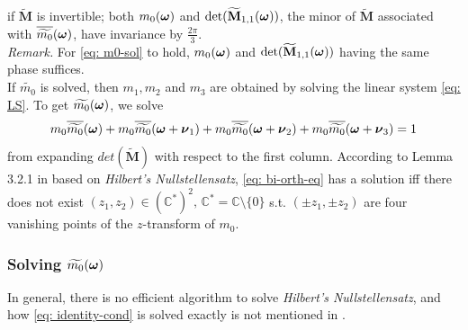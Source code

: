 if $\widetilde{\mathbf{M}}$ is invertible; both $m_{0}(\boldsymbol{\omega})$ and $\det(\widetilde{\mathbf{M}}_{1,1}(\boldsymbol{\omega}))$, the minor of $\widetilde{\mathbf{M}}$ associated with $\overline{\widetilde{m_{0}}}(\boldsymbol{\omega})$, have invariance by $\frac{2\pi}{3}$.\\
{\it Remark.} For \eqref{eq: m0-sol} to hold, $m_{0}(\boldsymbol{\omega})$ and $\det(\widetilde{\mathbf{M}}_{1,1}(\boldsymbol{\omega}))$ having the same phase suffices. \\
If $\widetilde{m_0}$ is solved, then $m_1,m_2$ and $m_3$ are obtained by solving the linear system \eqref{eq: LS}.
To get $\widetilde{m_{0}}(\boldsymbol{\omega})$, we solve 
\begin{align}\label{eq: bi-orth-eq}
m_0\overline{\widetilde{m_{0}}}(\boldsymbol{\omega}) + m_0\overline{\widetilde{m_{0}}}(\boldsymbol{\omega} + \boldsymbol{\nu}_{1}) + m_0\overline{\widetilde{m_{0}}}(\boldsymbol{\omega} + \boldsymbol{\nu}_{2}) + m_0\overline{\widetilde{m_{0}}}(\boldsymbol{\omega} + \boldsymbol{\nu}_{3}) = 1
\end{align}
from expanding $det(\widetilde{\mathbf{M}})$ with respect to the first column.
According to Lemma 3.2.1 in \cite{cohen1993compactly} based on {\it Hilbert's Nullstellensatz}, \eqref{eq: bi-orth-eq} has a solution iff there does not exist $(z_1,z_2)\in (\mathbb{C}^*)^2,\, \mathbb{C}^* = \mathbb{C}\setminus\{0\}$ s.t. $(\pm z_1,\pm z_2)$ are four 
vanishing points of the $z$-transform of $m_0$.

\subsubsection{Solving $\widetilde{m_{0}}(\boldsymbol{\omega})$}
In general, there is no efficient algorithm to solve {\it Hilbert's Nullstellensatz}, and how \eqref{eq: identity-cond} is solved exactly is not mentioned in \cite{cohen1993compactly}.

